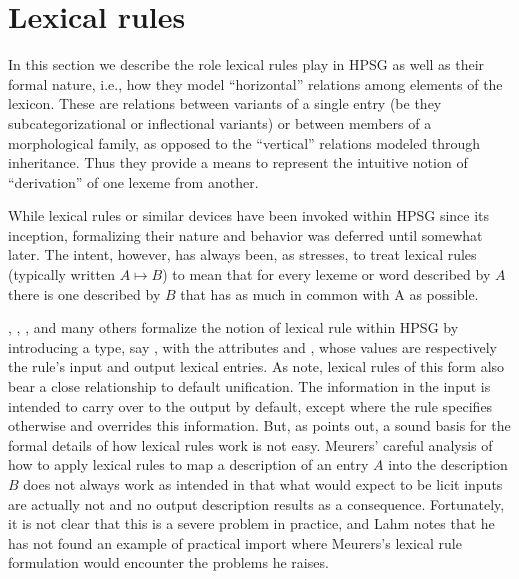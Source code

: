 \documentclass[output=paper]{langsci/langscibook}
\begin{document}
\section{Lexical rules}

In this section we describe the role lexical rules play in HPSG as well as their formal nature, i.e., how they model ``horizontal'' relations among elements of the lexicon. These are relations between variants of a single entry (be they subcategorizational or inflectional variants) or between members of a morphological family, as opposed to the ``vertical'' relations modeled through inheritance. Thus they provide a means to represent the intuitive notion of ``derivation'' of one lexeme from another. 

While lexical rules or similar devices have been invoked within HPSG since its inception, formalizing their nature and behavior was deferred until somewhat later. 
The intent, however, has always been, as \citet{Lahm2016} stresses, to treat lexical rules (typically written $A \mapsto B$) to mean that for every lexeme or word described by $A$ there is one described by $B$ that has as much in common with A as possible.

\citet{CopestakeandBriscoe1991}, \citet{BriscoeandCopestake1999}, \citet{Meurers2001}, and many others formalize the notion of lexical rule within HPSG by introducing a type, say , with the attributes  and , whose values are respectively the rule's input and output lexical entries. As \citet{BriscoeandCopestake1999} note, lexical rules of this form also bear a close relationship to default unification.
The information in the input is intended to carry over to the output by default, except where the rule specifies otherwise and overrides this information. But, as \citet{Lahm2016} points out, a sound basis for the formal details of how lexical rules work is not easy. Meurers' careful analysis of how to apply lexical rules to map a description of an entry $A$ into the description $B$ does not always work as intended in that what would expect to be licit inputs are actually not and no output description results as a consequence. Fortunately,  it is not clear that this is a severe problem in practice, and Lahm notes that he has not found an example of practical import where Meurers's lexical rule formulation would encounter the problems he raises.
\end{document}

